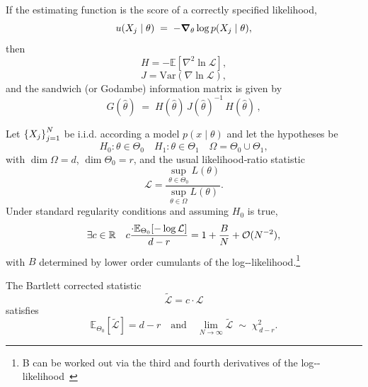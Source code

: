 \begin{theorem}
\noproofref
            \noproofref
            If the estimating function is the score of a correctly specified likelihood,
            \[
                u(X_j\mid\theta)\;=\;-\grad_{\theta}\log p(X_j\mid\theta),
            \]
            then
            \[
                H = -\mathbb{E}[\nabla^2 \ln \mathcal{L}],
            \]
            \[
                J = \mathrm{Var}(\nabla \ln \mathcal{L}),
            \]
            and the sandwich (or Godambe) information matrix is given by
            \[
                G(\hat{\theta}) \;=\; H(\hat{\theta})\, J(\hat{\theta})^{-1}\, H(\hat{\theta}) \,,
            \]
            \end{theorem}

\begin{theorem}
\noproofref
\noproofref
    Let \(\qty{X_j}_{j=1}^N\) be i.i.d. according a model \(p(x\mid\theta)\) and let the hypotheses be
    \[
        H_{0}:\theta\in\Theta_{0} \quad H_{1}:\theta\in\Theta_{1}\quad \Omega = \Theta_0\cup\Theta_1,
    \]
    with \(\dim\Omega=d\), \(\dim\Theta_{0}=r\), and the usual likelihood‐ratio statistic
    \[
        \mathcal L = \frac{\sup_{\theta\in\Theta_{0}}L(\theta)}{\sup_{\theta\in\Omega}L(\theta)}.
    \]
    Under standard regularity conditions and assuming \(H_{0}\) is true,
    \[
        \exists c\in\mathbb{R}\quad c\frac{\cdot\mathbb{E}_{\Theta_{0}}[-\log\mathcal L]}{d-r} = 1 + \frac{B}{N} + \mathcal{O}(N^{-2}),
    \]
    with \(B\) determined by lower order cumulants of the log‐-likelihood.\footnote{B can be worked out via the third and fourth derivatives of the log‐-likelihood~\cite{lawley_tests_1956}}
\end{theorem}

\begin{theorem}
\noproofref
\noproofref
    The Bartlett corrected statistic
    \[
        \widetilde{\mathcal L} = c\cdot \mathcal L
    \]
    satisfies
    \[
        \mathbb{E}_{\Theta_{0}}[\widetilde{\mathcal L}] = d-r
        \quad\text{and}\quad
        \lim_{N\to\infty}\widetilde{\mathcal L}\;\sim\;\chi^{2}_{\,d-r}.
    \]
\end{theorem}




